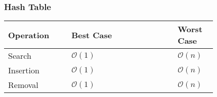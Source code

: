     \subsubsection{Hash Table}
        \begin{tabular*}{\linewidth}{| p{0.25\linewidth} | p{0.42\linewidth} | p{0.15\linewidth} |}
            \hline
            Operation & Best Case & Worst Case\\
            \hline \hline
            Search & $\mathcal{O}(1)$ & $\mathcal{O}(n)$ \\
            \hline
            Insertion & $\mathcal{O}(1)$ & $\mathcal{O}(n)$ \\
            \hline
            Removal & $\mathcal{O}(1)$ & $\mathcal{O}(n)$ \\
            \hline

        \end{tabular*}